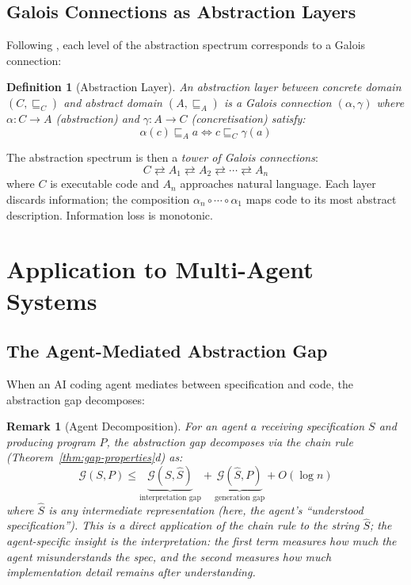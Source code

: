 \documentclass[11pt, a4paper, logo, copyright]{googledeepmind}
\newtheorem{definition}{Definition}[section]
\newtheorem*{remark}{Remark}
\begin{document}
\subsection{Galois Connections as Abstraction Layers}

Following \citet{cousot1977abstract}, each level of the abstraction spectrum corresponds to a Galois connection:

\begin{definition}[Abstraction Layer]
An \emph{abstraction layer} between concrete domain $(C, \sqsubseteq_C)$ and abstract domain $(A, \sqsubseteq_A)$ is a Galois connection $(\alpha, \gamma)$ where $\alpha: C \to A$ (abstraction) and $\gamma: A \to C$ (concretisation) satisfy:
\begin{equation}
    \alpha(c) \sqsubseteq_A a \iff c \sqsubseteq_C \gamma(a)
\end{equation}
\end{definition}

The abstraction spectrum is then a \emph{tower of Galois connections}:
\begin{equation}
    C \rightleftarrows A_1 \rightleftarrows A_2 \rightleftarrows \cdots \rightleftarrows A_n
\end{equation}
where $C$ is executable code and $A_n$ approaches natural language. Each layer discards information; the composition $\alpha_n \circ \cdots \circ \alpha_1$ maps code to its most abstract description. Information loss is monotonic.


\section{Application to Multi-Agent Systems}
\label{sec:multi-agent}

\subsection{The Agent-Mediated Abstraction Gap}

When an AI coding agent mediates between specification and code, the abstraction gap decomposes:

\begin{remark}[Agent Decomposition]
\label{prop:agent-decomp}
For an agent $a$ receiving specification $S$ and producing program $P$, the abstraction gap decomposes via the chain rule (Theorem~\ref{thm:gap-properties}d) as:
\begin{equation}
    \mathcal{G}(S, P) \leq \underbrace{\mathcal{G}(S, \hat{S})}_{\text{interpretation gap}} + \underbrace{\mathcal{G}(\hat{S}, P)}_{\text{generation gap}} + O(\log n)
\end{equation}
where $\hat{S}$ is any intermediate representation (here, the agent's ``understood specification''). This is a direct application of the chain rule to the string $\hat{S}$; the agent-specific insight is the \emph{interpretation}: the first term measures how much the agent misunderstands the spec, and the second measures how much implementation detail remains after understanding.
\end{remark}
\end{document}
